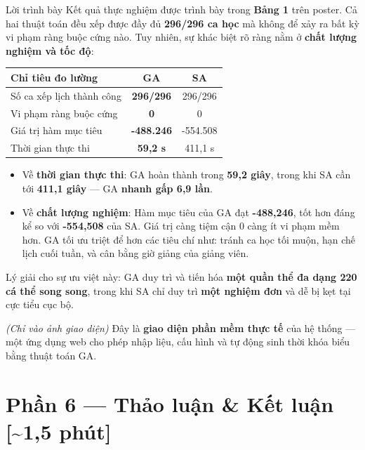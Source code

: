 \documentclass[12pt, a4paper]{article}
\begin{document}
\begin{scriptbox}{Lời trình bày}
Kết quả thực nghiệm được trình bày trong \textbf{Bảng 1} trên poster. Cả hai thuật toán đều xếp được đầy đủ \textbf{296/296 ca học} mà không để xảy ra bất kỳ vi phạm ràng buộc cứng nào. Tuy nhiên, sự khác biệt rõ ràng nằm ở \textbf{chất lượng nghiệm và tốc độ}:

\medskip
\begin{center}
\renewcommand{\arraystretch}{1.4}
\begin{tabularx}{0.92\textwidth}{X c c}
  \toprule
  \textbf{Chỉ tiêu đo lường} & \textbf{GA} & \textbf{SA} \\
  \midrule
  Số ca xếp lịch thành công & \textbf{296/296} & 296/296 \\
  Vi phạm ràng buộc cứng   & \textbf{0} & 0 \\
  Giá trị hàm mục tiêu      & \textbf{-488.246} & -554.508 \\
  Thời gian thực thi         & \textbf{59,2 s} & 411,1 s \\
  \bottomrule
\end{tabularx}
\end{center}

\medskip
\begin{itemize}[leftmargin=1.5cm, itemsep=4pt]
  \item Về \textbf{thời gian thực thi}: GA hoàn thành trong \textbf{59,2 giây}, trong khi SA cần tới \textbf{411,1 giây} --- GA \textbf{nhanh gấp 6,9 lần}.
  \item Về \textbf{chất lượng nghiệm}: Hàm mục tiêu của GA đạt \textbf{-488,246}, tốt hơn đáng kể so với \textbf{-554,508} của SA. Giá trị càng tiệm cận 0 càng ít vi phạm mềm hơn. GA tối ưu triệt để hơn các tiêu chí như: tránh ca học tối muộn, hạn chế lịch cuối tuần, và cân bằng giờ giảng của giảng viên.
\end{itemize}

\medskip
Lý giải cho sự ưu việt này: GA duy trì và tiến hóa \textbf{một quần thể đa dạng 220 cá thể song song}, trong khi SA chỉ duy trì \textbf{một nghiệm đơn} và dễ bị kẹt tại cực tiểu cục bộ.

\medskip
\textit{(Chỉ vào ảnh giao diện)} \quad Đây là \textbf{giao diện phần mềm thực tế} của hệ thống --- một ứng dụng web cho phép nhập liệu, cấu hình và tự động sinh thời khóa biểu bằng thuật toán GA.
\end{scriptbox}

\section{Phần 6 — Thảo luận \& Kết luận \hfill{\normalfont\color{MidGray}[\textasciitilde{}1,5 phút]}}
\end{document}
